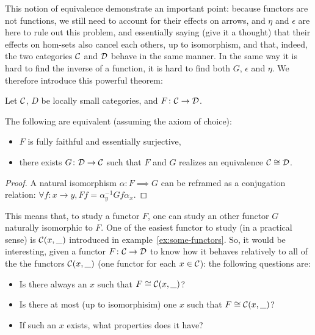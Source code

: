 \documentclass[a4paper]{article}
\theoremstyle { remark }
\theoremstyle { definition }
\theoremstyle { plain }
\newtheorem { theorem } { Theorem }
\begin{document}
This notion of equivalence demonstrate an important point:
because functors are not functions, we still need to account for their effects on arrows, and \( \eta \) and \( \epsilon \) are here to rule out this problem, and essentially saying (give it a thought) that their effects on hom-sets also cancel each others, up to isomorphism, and that, indeed, the two categories \(  \mathcal { C }  \) and \(  \mathcal { D }  \) behave in the same manner.
In the same way it is hard to find the inverse of a function, it is hard to find both \( G \), \( \epsilon \) and \( \eta \).
We therefore introduce this powerful theorem:

\begin{theorem}
Let \(  \mathcal { C }  \), \( D \) be locally small categories, and \( F \colon  \mathcal { C }  \to  \mathcal { D }  \).

The following are equivalent (assuming the axiom of choice): 
\begin{itemize}
  \item \( F \) is fully faithful and essentially surjective,
  \item there exists \( G \colon  \mathcal { D }  \to  \mathcal { C }  \) such that \( F \) and \( G \) realizes an equivalence \(  \mathcal { C }  \cong  \mathcal { D }  \).
\end{itemize}

\begin{proof}
A natural isomorphism \( \alpha \colon F \implies G \) can be reframed as a conjugation relation: \( \forall f \colon x \to y, F f = \alpha^{-1}_y G f \alpha_x \).
\end{proof}
\end{theorem}

This means that, to study a functor \( F \), one can study an other functor \( G \) naturally isomorphic to \( F \).
One of the easiest functor to study (in a practical sense) is \(  \mathcal { C } (x, \_) \) introduced in example~\ref{ex:some-functors}.
So, it would be interesting, given a functor \( F \colon  \mathcal { C }  \to  \mathcal { D }  \) to know how it behaves relatively to all of the the functors $ \mathcal { C } (x, \_)$ (one functor for each \( x \in  \mathcal { C }  \)): the following questions are:
\begin{itemize}
  \item Is there always an \( x \) such that \( F \cong  \mathcal { C } (x, \_) \)?
  \item Is there at most (up to isomorphisim) one \( x \) such that \( F \cong  \mathcal { C } (x, \_) \)?
  \item If such an \( x \) exists, what properties does it have?
\end{itemize}
\end{document}

